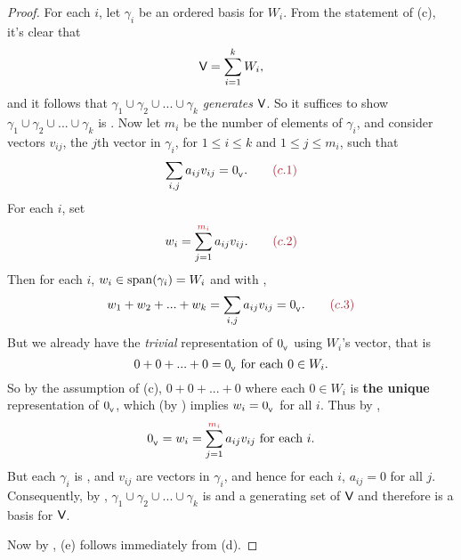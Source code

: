 \begin{proof}
For each \(i\), let \(\gamma_i\) be an ordered basis for \(W_i\).
From the statement of (c), it's clear that
\[
    \textsf{V} = \sum_{i = 1}^k W_i,
\]
and it follows that \(\gamma_1 \cup \gamma_2 \cup ... \cup \gamma_k\) \emph{generates} \(\textsf{V}\).
So it suffices to show \(\gamma_1 \cup \gamma_2 \cup ... \cup \gamma_k\) is \LID{}.
Now let \(m_i\) be the number of elements of \(\gamma_i\), and consider vectors \(v_{ij}\), the \(j\)th vector in \(\gamma_i\), for \(1 \le i \le k\) and \(1 \le j \le m_i\), such that
\[
    \sum_{i, j} a_{ij} v_{ij} = \OV. \quad \quad \MAROON{(c.1)}
\]
For each \(i\), set
\[
    w_i = \sum_{j = 1}^{\RED{m_i}} a_{ij} v_{ij}. \quad \quad \MAROON{(c.2)}
\]
Then for each \(i\), \(w_i \in \operatorname{span}(\gamma_i) = W_i\) and with ,
\[
    w_1 + w_2 + ... + w_k = \sum_{i, j} a_{ij} v_{ij} = \OV. \quad \quad \MAROON{(c.3)}
\]
But we already have the \emph{trivial} representation of \(0_{_{\textsf{V}}}\) using \(W_i\)'s vector, that is
\[
    0 + 0 + ... + 0 = 0_{_{\textsf{V}}} \text{ for each } 0 \in W_i.
\]
So by the assumption of (c), \(0 + 0 + ... + 0\) where each \(0 \in W_i\) is \textbf{the unique} representation of \(0_{_{\textsf{V}}}\), which (by ) implies \(w_i = 0_{_{\textsf{V}}}\) for all \(i\).
Thus by ,
\[
    \OV = w_i = \sum_{j = 1}^{\RED{m_i}} a_{ij} v_{ij} \text{ for each } i.
\]
But each \(\gamma_i\) is \LID{}, and \(v_{ij}\) are vectors in \(\gamma_i\), and hence for each \(i\), \(a_{ij} = 0\) for all \(j\).
Consequently, by , \(\gamma_1 \cup \gamma_2 \cup ... \cup \gamma_k\) is \LID{} and a generating set of \(\textsf{V}\) and therefore is a basis for \(\textsf{V}\).

Now by , (e) follows immediately from (d).


\end{proof}
